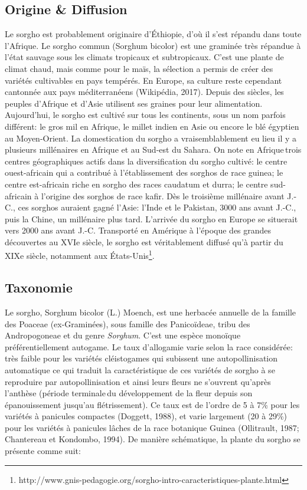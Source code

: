 \documentclass[a4paper,11pt]{article}
\begin{document}
\subsection{Origine \& Diffusion}
Le sorgho est probablement originaire d’Éthiopie, d’où il s’est
répandu dans toute l’Afrique. Le sorgho commun (Sorghum bicolor) est
une graminée très répandue à l’état sauvage sous les climats tropicaux
et subtropicaux. C’est une plante de climat chaud, mais comme pour le
maïs, la sélection a permis de créer des variétés cultivables en pays
tempérés. En Europe, sa culture reste cependant cantonnée aux pays
méditerranéens (Wikipédia, 2017). Depuis des siècles, les peuples
d’Afrique et d’Asie utilisent ses graines pour leur
alimentation. Aujourd’hui, le sorgho est cultivé sur tous les
continents, sous un nom parfois différent: le gros mil en Afrique, le
millet indien en Asie ou encore le blé égyptien au Moyen-Orient. La
domestication du sorgho a vraisemblablement eu lieu il y a plusieurs
millénaires en Afrique et au Sud-est du Sahara.  On note en
Afrique\,trois centres géographiques actifs dans la diversification du
sorgho cultivé: le centre ouest-africain qui a contribué à
l’établissement des sorghos de race guinea; le centre est-africain
riche en sorgho des races caudatum et durra; le centre sud-africain à
l’origine des sorghos de race kafir. Dès le troisième millénaire
avant J.-C., ces sorghos auraient gagné l’Asie: l’Inde et le Pakistan,
3000 ans avant J.-C., puis la Chine, un millénaire plus
tard. L’arrivée du sorgho en Europe se situerait vers 2000 ans avant
J.-C. Transporté en Amérique à l’époque des grandes découvertes au
XVIe siècle, le sorgho est véritablement diffusé qu’à partir du XIXe
siècle, notamment aux
États-Unis\footnote{http://www.gnis-pedagogie.org/sorgho-intro-caracteristiques-plante.html}.

\subsection{Taxonomie}
Le sorgho, Sorghum bicolor (L.) Moench, est une herbacée annuelle de
la famille des Poaceae (ex-Graminées), sous famille des Panicoïdeae,
tribu des Andropogoneae et du genre \emph{Sorghum}\cite{Doggett_1988}.
C’est une espèce monoïque préférentiellement
autogame. Le taux d’allogamie varie selon la race considérée: très
faible pour les variétés cléistogames qui subissent une
autopollinisation automatique ce qui traduit la caractéristique de ces
variétés de sorgho à se reproduire par autopollinisation et ainsi
leurs fleurs ne s’ouvrent qu’après l’anthèse (période terminale\,du
développement de la fleur depuis son épanouissement jusqu’au
flétrissement). Ce taux est de l’ordre de 5 à 7\% pour les variétés à
panicules compactes (Doggett, 1988), et varie largement (20 à 29\%)
pour les variétés à panicules lâches de la race botanique Guinea
(Ollitrault, 1987; Chantereau et Kondombo, 1994). De manière
schématique, la plante du sorgho se présente comme suit:
\end{document}
